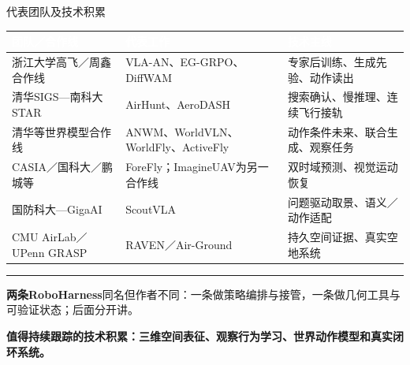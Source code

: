 \documentclass[aspectratio=169,10pt]{beamer}
\def\slidesource{}
\newcommand{\takeaway}[1]{\par\begin{takebox}\fontsize{9.1}{11.5}\selectfont\bfseries\color{navy}#1\end{takebox}}
\newcommand{\ph}[1]{{\color{teal}\rule[-0.35mm]{0.8mm}{3.1mm}}\hspace{1.1mm}\textbf{\color{navy}#1}}
\newcommand{\thd}[1]{\textcolor{white}{\bfseries #1}}
\begin{document}
\begin{frame}[t,label=teams]{代表团队及技术积累}
\relax
{\fontsize{8.7}{11.1}\selectfont
{}
\begin{tabularx}{\linewidth}{@{}Y{0.99}Y{1.02}Y{0.99}@{}}\toprule
{}\thd{团队／合作线} & \thd{代表工作} & \thd{技术主线}\\\midrule
浙江大学高飞／周鑫合作线 & VLA-AN、EG-GRPO、DiffWAM & 专家后训练、生成先验、动作读出\\
清华SIGS—南科大STAR & AirHunt、AeroDASH & 搜索确认、慢推理、连续飞行接轨\\
清华等世界模型合作线 & ANWM、WorldVLN、WorldFly、ActiveFly & 动作条件未来、联合生成、观察任务\\
CASIA／国科大／鹏城等 & ForeFly；ImagineUAV为另一合作线 & 双时域预测、视觉运动恢复\\
国防科大—GigaAI & ScoutVLA & 问题驱动取景、语义／动作适配\\
CMU AirLab／UPenn GRASP & RAVEN／Air-Ground & 持久空间证据、真实空地系统\\
\bottomrule\end{tabularx}\par}
\par\ph{两条RoboHarness}\quad 同名但作者不同：一条做策略编排与接管，一条做几何工具与可验证状态；后面分开讲。\par\vspace{1mm}
\takeaway{值得持续跟踪的技术积累：三维空间表征、观察行为学习、世界动作模型和真实闭环系统。}

\end{frame}
\gdef\slidesource{原文依据：\href{https://arxiv.org/html/2502.18041v7}{[1] OpenFly}；\href{https://arxiv.org/html/2410.07087v2}{[2] TravelUAV}；\href{https://arxiv.org/html/2505.15725v2}{[3] UAV-Flow}；\href{https://arxiv.org/html/2506.02896v3}{[4] FlySearch}；\href{https://arxiv.org/html/2601.07558v1}{[14] FlyCo}}
\end{document}
